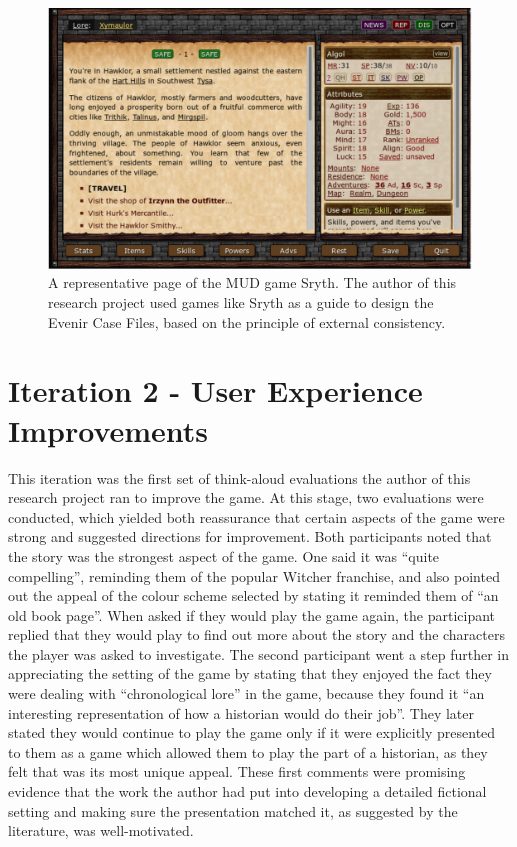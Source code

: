 \documentclass{l4proj}
\begin{document}
\begin{figure}[htb]
    \centering
    \includegraphics[scale=0.5]{images/SrythScreen.png}
    \caption{A representative page of the MUD game Sryth. The author of this research project used games like Sryth as a guide to design the Evenir Case Files, based on the principle of external consistency.}
    \label{fig:sryth}
\end{figure}

\section{Iteration 2 - User Experience Improvements}

This iteration was the first set of think-aloud evaluations the author of this research project ran to improve the game. At this stage, two evaluations were conducted, which yielded both reassurance that certain aspects of the game were strong and suggested directions for improvement. Both participants noted that the story was the strongest aspect of the game. One said it was “quite compelling”, reminding them of the popular Witcher franchise, and also pointed out the appeal of the colour scheme selected by stating it reminded them of “an old book page”. When asked if they would play the game again, the participant replied that they would play to find out more about the story and the characters the player was asked to investigate. The second participant went a step further in appreciating the setting of the game by stating that they enjoyed the fact they were dealing with “chronological lore” in the game, because they found it “an interesting representation of how a historian would do their job”. They later stated they would continue to play the game only if it were explicitly presented to them as a game which allowed them to play the part of a historian, as they felt that was its most unique appeal. These first comments were promising evidence that the work the author had put into developing a detailed fictional setting and making sure the presentation matched it, as suggested by the literature, was well-motivated. 
\end{document}
